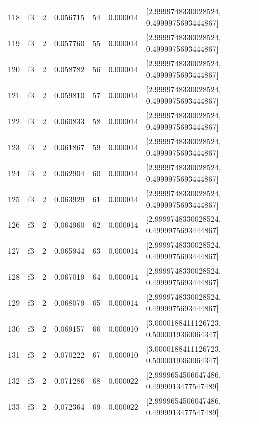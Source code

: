 \begin{tabular}{lllrlrl}
118 &  f3 &   2 &  0.056715 &   54 &  0.000014 &   [2.9999748330028524, 0.4999975693444867] \\
119 &  f3 &   2 &  0.057760 &   55 &  0.000014 &   [2.9999748330028524, 0.4999975693444867] \\
120 &  f3 &   2 &  0.058782 &   56 &  0.000014 &   [2.9999748330028524, 0.4999975693444867] \\
121 &  f3 &   2 &  0.059810 &   57 &  0.000014 &   [2.9999748330028524, 0.4999975693444867] \\
122 &  f3 &   2 &  0.060833 &   58 &  0.000014 &   [2.9999748330028524, 0.4999975693444867] \\
123 &  f3 &   2 &  0.061867 &   59 &  0.000014 &   [2.9999748330028524, 0.4999975693444867] \\
124 &  f3 &   2 &  0.062904 &   60 &  0.000014 &   [2.9999748330028524, 0.4999975693444867] \\
125 &  f3 &   2 &  0.063929 &   61 &  0.000014 &   [2.9999748330028524, 0.4999975693444867] \\
126 &  f3 &   2 &  0.064960 &   62 &  0.000014 &   [2.9999748330028524, 0.4999975693444867] \\
127 &  f3 &   2 &  0.065944 &   63 &  0.000014 &   [2.9999748330028524, 0.4999975693444867] \\
128 &  f3 &   2 &  0.067019 &   64 &  0.000014 &   [2.9999748330028524, 0.4999975693444867] \\
129 &  f3 &   2 &  0.068079 &   65 &  0.000014 &   [2.9999748330028524, 0.4999975693444867] \\
130 &  f3 &   2 &  0.069157 &   66 &  0.000010 &   [3.0000188411126723, 0.5000019360064347] \\
131 &  f3 &   2 &  0.070222 &   67 &  0.000010 &   [3.0000188411126723, 0.5000019360064347] \\
132 &  f3 &   2 &  0.071286 &   68 &  0.000022 &   [2.9999654506047486, 0.4999913477547489] \\
133 &  f3 &   2 &  0.072364 &   69 &  0.000022 &   [2.9999654506047486, 0.4999913477547489] \\
\bottomrule
\end{tabular}
